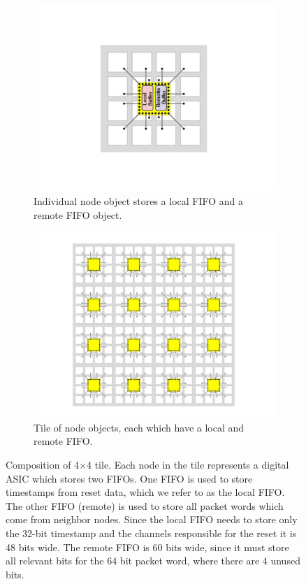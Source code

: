 \begin{figure}
\centering
\begin{subfigure}{.5\textwidth}
  \centering
  \includegraphics[width=\textwidth]{images/asic_FIFO_image.pdf}
  \caption{Individual node object stores a local FIFO and a remote FIFO object.}
\end{subfigure}%
\begin{subfigure}{.5\textwidth}
  \centering
  \includegraphics[width=\textwidth]{images/asic_tile_FIFO_image.pdf}
  \caption{Tile of node objects, each which have a local and remote FIFO.}
\end{subfigure}
\caption{Composition of  4$\times$4 tile. Each node in the tile represents a digital ASIC which stores two FIFOs.
One FIFO is used to store timestamps from reset data, which we refer to as the local FIFO.
The other FIFO (remote) is used to store all packet words which come from neighbor nodes.
Since the local FIFO needs to store only the 32-bit timestamp and the channels responsible for the reset it is 48 bits wide.
The remote FIFO is 60 bits wide, since it must store all relevant bits for the 64 bit packet word, where there are 4 unused bits.
}
\label{fig:node_fifo_objects}
\end{figure}

